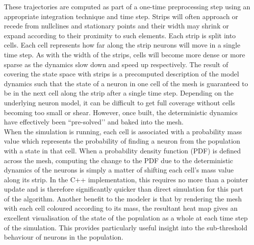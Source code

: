 \documentclass[utf8]{frontiersSCNS} %
\begin{document}
These trajectories are computed as part of a one-time preprocessing step using an appropriate integration technique and time step. Strips will often approach or recede from nullclines and stationary points and their width may shrink or expand according to their proximity to such elements. Each strip is split into cells. Each cell represents how far along the strip neurons will move in a single time step. As with the width of the strips, cells will become more dense or more sparse as the dynamics slow down and speed up respectively. The result of covering the state space with strips is a precomputed description of the model dynamics such that the state of a neuron in one cell of the mesh is guaranteed to be in the next cell along the strip after a single time step. Depending on the underlying neuron model, it can be difficult to get full coverage without cells becoming too small or shear. However, once built, the deterministic dynamics have effectively been ``pre-solved’’ and baked into the mesh.\\
When the simulation is running, each cell is associated with a probability mass value which represents the probability of finding a neuron from the population with a state in that cell. When a probability density function (PDF) is defined across the mesh, computing the change to the PDF due to the deterministic dynamics of the neurons is simply a matter of shifting each cell's mass value along its strip. In the C++ implementation, this requires no more than a pointer update and is therefore significantly quicker than direct simulation for this part of the algorithm. Another benefit to the modeler is that by rendering the mesh with each cell coloured according to its mass, the resultant heat map gives an excellent visualisation of the state of the population as a whole at each time step of the simulation. This provides particularly useful insight into the sub-threshold behaviour of neurons in the population.\\
\end{document}

